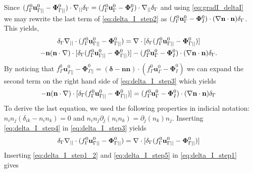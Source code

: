 Since $ (f_\Gamma^0 \textbf{u}_{\Gamma||}^0 - \mathbf{\Phi}_{\Gamma||}^0 )\cdot\mathbf{\nabla}_{||}\delta_\Gamma  = (f_\Gamma^0 \textbf{u}_\Gamma^0 - \mathbf{\Phi}_{I}^0 )\cdot\mathbf{\nabla}_{||}\delta_\Gamma$ and using \ref{eq:gradI_deltaI} we may rewrite the last term of \ref{eq:delta_I_step2} as $(f_\Gamma^0 \textbf{u}_\Gamma^0 - \mathbf{\Phi}_{I}^0 )\cdot(\mathbf{\nabla} \textbf{n}\cdot \textbf{n}) \delta_\Gamma$. This yields,
\begin{multline}
    \delta_\Gamma \divI (f_\Gamma^0 \textbf{u}_{\Gamma||}^0
    - \mathbf{\Phi}_{\Gamma||}^0 ) %
    = 
    \div [\delta_\Gamma (f_\Gamma^0 \textbf{u}_{\Gamma||}^0
    - \mathbf{\Phi}_{\Gamma||}^0 )] \\
    - \textbf{n}(\textbf{n}\cdot\grad)\cdot [\delta_\Gamma (f_\Gamma^0 \textbf{u}_{\Gamma||}^0
    - \mathbf{\Phi}_{\Gamma||}^0 )]
    - (f_\Gamma^0 \textbf{u}_\Gamma^0 - \mathbf{\Phi}_{I}^0 )\cdot(\grad \textbf{n}\cdot \textbf{n}) \delta_\Gamma.
\label{eq:delta_I_step3}
\end{multline}
By noticing that $f_\Gamma^0 \textbf{u}_{\Gamma||}^0
    - \mathbf{\Phi}_{\Gamma||}^0 = (\bm\delta - \textbf{nn})\cdot (f_\Gamma^0 \textbf{u}_\Gamma^0
    - \mathbf{\Phi}_{I}^0 )$ we can expand the second term on the right hand side of \ref{eq:delta_I_step3} which yields
\begin{equation}
    - \textbf{n}(\textbf{n}\cdot\grad)\cdot [\delta_\Gamma (f_\Gamma^0 \textbf{u}_{\Gamma||}^0
    - \mathbf{\Phi}_{\Gamma||}^0 )]
    = (f_\Gamma^0 \textbf{u}_\Gamma^0 - \mathbf{\Phi}_{I}^0 )\cdot(\grad \textbf{n}\cdot \textbf{n})\delta_\Gamma%
\label{eq:delta_I_step4}
\end{equation}
To derive the last equation, we used the following properties in indicial notation: $n_in_j(\delta_{ik}-n_in_k) =0$ and $n_in_j\partial_{j}(n_in_k)=\partial_{j}(n_k)n_j$. 
Inserting \ref{eq:delta_I_step4} in \ref{eq:delta_I_step3} yields
\begin{equation}
    \delta_\Gamma \divI (f_\Gamma^0 \textbf{u}_{\Gamma||}^0
    - \mathbf{\Phi}_{\Gamma||}^0 ) %
    = 
    \div [\delta_\Gamma (f_\Gamma^0 \textbf{u}_{\Gamma||}^0
    - \mathbf{\Phi}_{\Gamma||}^0 )]
\label{eq:delta_I_step5}
\end{equation}
Inserting \ref{eq:delta_I_step1_2} and \ref{eq:delta_I_step5} in \ref{eq:delta_I_step1} gives

